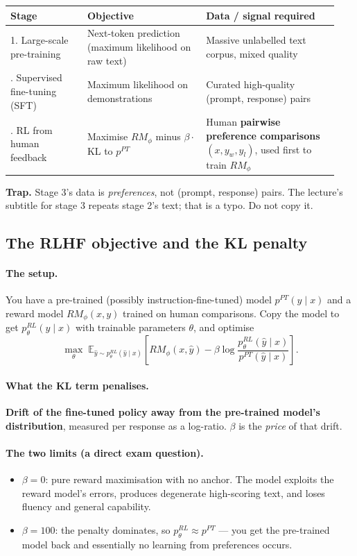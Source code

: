 \documentclass[11pt,a4paper]{article}
\begin{document}
\begin{center}
\begin{tabular}{@{}p{0.22\linewidth}p{0.34\linewidth}p{0.38\linewidth}@{}}
\toprule
\textbf{Stage} & \textbf{Objective} & \textbf{Data / signal required} \\
\midrule
1. Large-scale pre-training & Next-token prediction (maximum likelihood on raw text) & Massive unlabelled text corpus, mixed quality \\
\addlinespace
2. Supervised fine-tuning (SFT) & Maximum likelihood on demonstrations & Curated high-quality (prompt, response) pairs \\
\addlinespace
3. RL from human feedback & Maximise $RM_\phi$ minus $\beta\cdot$KL to $p^{PT}$ & Human \textbf{pairwise preference comparisons} $(x,y_w,y_l)$, used first to train $RM_\phi$ \\
\bottomrule
\end{tabular}
\end{center}

\noindent\textbf{Trap.} Stage 3's data is \emph{preferences}, not (prompt,
response) pairs. The lecture's subtitle for stage 3 repeats stage 2's text;
that is a typo. Do not copy it.

\subsection{The RLHF objective and the KL penalty}

\paragraph{The setup.} You have a pre-trained (possibly
instruction-fine-tuned) model $p^{PT}(y\mid x)$ and a reward model
$RM_\phi(x,y)$ trained on human comparisons. Copy the model to get
$p^{RL}_\theta(y\mid x)$ with trainable parameters $\theta$, and optimise
\[
\max_\theta\; \mathbb E_{\hat y\sim p^{RL}_\theta(\hat y\mid x)}
\left[RM_\phi(x,\hat y)-\beta\log\frac{p^{RL}_\theta(\hat y\mid x)}{p^{PT}(\hat y\mid x)}\right].
\]

\paragraph{What the KL term penalises.} \textbf{Drift of the fine-tuned policy
away from the pre-trained model's distribution}, measured per response as a
log-ratio. $\beta$ is the \emph{price} of that drift.

\paragraph{The two limits (a direct exam question).}
\begin{itemize}
\item $\beta=0$: pure reward maximisation with no anchor. The model exploits
the reward model's errors, produces degenerate high-scoring text, and loses
fluency and general capability.
\item $\beta=100$: the penalty dominates, so $p^{RL}_\theta\approx p^{PT}$ ---
you get the pre-trained model back and essentially no learning from
preferences occurs.
\end{itemize}
\end{document}
